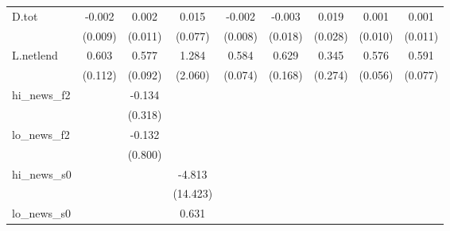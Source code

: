 {\begin{tabular}{l*{8}{c}}
\addlinespace
D.tot       &      -0.002         &       0.002         &       0.015         &      -0.002         &      -0.003         &       0.019         &       0.001         &       0.001         \\
            &     (0.009)         &     (0.011)         &     (0.077)         &     (0.008)         &     (0.018)         &     (0.028)         &     (0.010)         &     (0.011)         \\
\addlinespace
L.netlend   &       0.603\sym{***}&       0.577\sym{***}&       1.284         &       0.584\sym{***}&       0.629\sym{***}&       0.345         &       0.576\sym{***}&       0.591\sym{***}\\
            &     (0.112)         &     (0.092)         &     (2.060)         &     (0.074)         &     (0.168)         &     (0.274)         &     (0.056)         &     (0.077)         \\
\addlinespace
hi\_news\_f2  &                     &      -0.134         &                     &                     &                     &                     &                     &                     \\
            &                     &     (0.318)         &                     &                     &                     &                     &                     &                     \\
\addlinespace
lo\_news\_f2  &                     &      -0.132         &                     &                     &                     &                     &                     &                     \\
            &                     &     (0.800)         &                     &                     &                     &                     &                     &                     \\
\addlinespace
hi\_news\_s0  &                     &                     &      -4.813         &                     &                     &                     &                     &                     \\
            &                     &                     &    (14.423)         &                     &                     &                     &                     &                     \\
\addlinespace
lo\_news\_s0  &                     &                     &       0.631         &                     &                     &                     &                     &                     \\

\end{tabular}}
